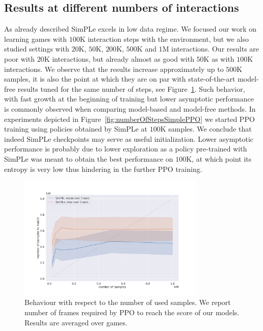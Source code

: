 \subsection{Results at different numbers of interactions}  As already described SimPLe excels in low data regime. We  focused our work on learning games with $100$K interaction steps with the environment, but we also studied settings with $20$K, $50$K, $200$K, $500$K and $1$M interactions. Our results are poor with $20$K interactions, but already almost as good with $50$K as with $100$K interactions. We observe that the results increase approximately up to $500$K samples, it is also the point at which they are on par with state-of-the-art model-free results tuned for the same number of steps, see Figure~\ref{fig:numberOfStepsSimple}. Such behavior, with fast growth at the beginning of training but lower asymptotic performance is commonly observed when comparing model-based and model-free methods. In experiments depicted in Figure~\ref{fig:numberOfStepsSimplePPO} we started PPO training using policies obtained by SimPLe at $100$K samples. We conclude that indeed SimPLe checkpoints may serve as useful initialization. Lower asymptotic performance is probably due to lower exploration as a policy pre-trained with SimPLe was meant to obtain the best performance on $100$K, at which point its entropy is very low thus hindering in the further PPO training.

\newcommand{\mywidth}{3.5in}
\setlength{\tabcolsep}{-2em}
\begin{figure}
	\includegraphics[width = \mywidth ]{figures/number_of_step_simple.pdf}
	\caption{Behaviour with respect to the number of used samples. We report number of frames required by PPO to reach the score of our models. Results are averaged over games.\label{fig:numberOfStepsSimple}}
\end{figure}


